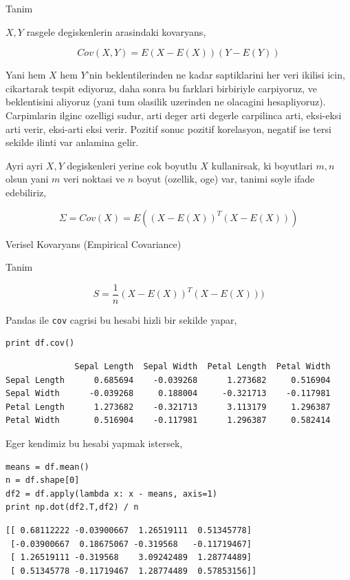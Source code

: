 \documentclass[12pt,fleqn]{article}\usepackage{../common}
\begin{document}
Tanim

$X,Y$ rasgele degiskenlerin arasindaki kovaryans,

$$ Cov(X,Y) = E(X-E(X))(Y-E(Y)) $$

Yani hem $X$ hem $Y$'nin beklentilerinden ne kadar saptiklarini her veri
ikilisi icin, cikartarak tespit ediyoruz, daha sonra bu farklari birbiriyle
carpiyoruz, ve beklentisini aliyoruz (yani tum olasilik uzerinden ne
olacagini hesapliyoruz). Carpimlarin ilginc ozelligi sudur, arti deger arti
degerle carpilinca arti, eksi-eksi arti verir, eksi-arti eksi
verir. Pozitif sonuc pozitif korelasyon, negatif ise tersi sekilde ilinti
var anlamina gelir. 

Ayri ayri $X,Y$ degiskenleri yerine cok boyutlu $X$ kullanirsak, ki
boyutlari $m,n$ olsun yani $m$ veri noktasi ve $n$ boyut (ozellik, oge)
var, tanimi soyle ifade edebiliriz,

$$ \Sigma = Cov(X) = E((X-E(X))^T(X-E(X))) $$

Verisel Kovaryans (Empirical Covariance) 

Tanim

$$ S = \frac{1}{n} (X-E(X))^T(X-E(X))) $$

Pandas ile \verb!cov! cagrisi bu hesabi hizli bir sekilde yapar,

\begin{verbatim}
print df.cov()
\end{verbatim}

\begin{verbatim}
              Sepal Length  Sepal Width  Petal Length  Petal Width
Sepal Length      0.685694    -0.039268      1.273682     0.516904
Sepal Width      -0.039268     0.188004     -0.321713    -0.117981
Petal Length      1.273682    -0.321713      3.113179     1.296387
Petal Width       0.516904    -0.117981      1.296387     0.582414
\end{verbatim}

Eger kendimiz bu hesabi yapmak istersek,

\begin{verbatim}
means = df.mean()
n = df.shape[0]
df2 = df.apply(lambda x: x - means, axis=1)
print np.dot(df2.T,df2) / n
\end{verbatim}

\begin{verbatim}
[[ 0.68112222 -0.03900667  1.26519111  0.51345778]
 [-0.03900667  0.18675067 -0.319568   -0.11719467]
 [ 1.26519111 -0.319568    3.09242489  1.28774489]
 [ 0.51345778 -0.11719467  1.28774489  0.57853156]]
\end{verbatim}
\end{document}
